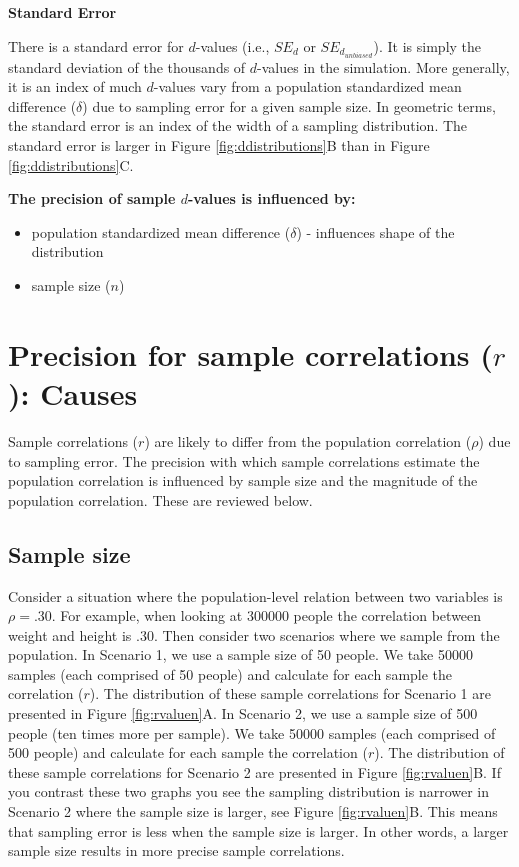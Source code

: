 \documentclass[
]{krantz}
\begin{document}
\textbf{Standard Error}

There is a standard error for \(d\)-values (i.e., \(SE_d\) or \(SE_{d_{unbiased}}\)). It is simply the standard deviation of the thousands of \(d\)-values in the simulation. More generally, it is an index of much \(d\)-values vary from a population standardized mean difference (\(\delta\)) due to sampling error for a given sample size. In geometric terms, the standard error is an index of the width of a sampling distribution. The standard error is larger in Figure \ref{fig:ddistributions}B than in Figure \ref{fig:ddistributions}C.

\textbf{The precision of sample \(d\)-values is influenced by:}

\begin{itemize}
\item
  population standardized mean difference (\(\delta\)) - influences shape of the distribution
\item
  sample size (\(n\))
\end{itemize}

\hypertarget{precision-for-sample-correlations-r-causes}{%
\section{\texorpdfstring{Precision for sample correlations (\(r\)): Causes}{Precision for sample correlations (r): Causes}}\label{precision-for-sample-correlations-r-causes}}

Sample correlations (\(r\)) are likely to differ from the population correlation (\(\rho\)) due to sampling error. The precision with which sample correlations estimate the population correlation is influenced by sample size and the magnitude of the population correlation. These are reviewed below.

\hypertarget{sample-size-1}{%
\subsection{Sample size}\label{sample-size-1}}

Consider a situation where the population-level relation between two variables is \(\rho = .30\). For example, when looking at 300000 people the correlation between weight and height is .30. Then consider two scenarios where we sample from the population. In Scenario 1, we use a sample size of 50 people. We take 50000 samples (each comprised of 50 people) and calculate for each sample the correlation (\(r\)). The distribution of these sample correlations for Scenario 1 are presented in Figure \ref{fig:rvaluen}A. In Scenario 2, we use a sample size of 500 people (ten times more per sample). We take 50000 samples (each comprised of 500 people) and calculate for each sample the correlation (\(r\)). The distribution of these sample correlations for Scenario 2 are presented in Figure \ref{fig:rvaluen}B. If you contrast these two graphs you see the sampling distribution is narrower in Scenario 2 where the sample size is larger, see Figure \ref{fig:rvaluen}B. This means that sampling error is less when the sample size is larger. In other words, a larger sample size results in more precise sample correlations.
\end{document}

